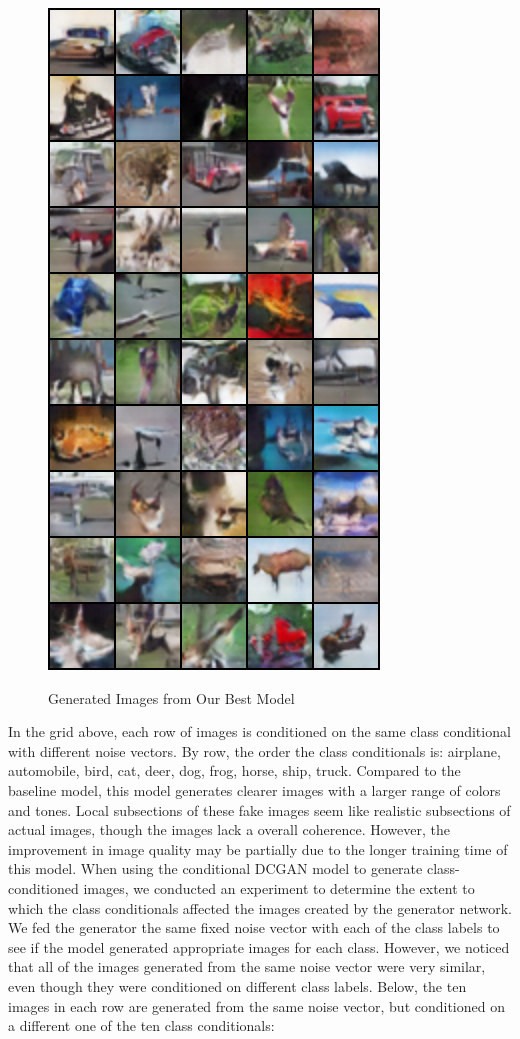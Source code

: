 \documentclass[a4paper]{article}
\begin{document}
\begin{figure}[H]
  \includegraphics[scale=0.5]{images/conditional_400_10x5_generated.png}
  \label{fig:boat1}
  \caption{Generated Images from Our Best Model}
\end{figure}
In the grid above, each row of images is conditioned on the same class conditional with different noise vectors. By row, the order the class conditionals is: airplane, automobile, bird, cat, deer, dog, frog, horse, ship, truck. Compared to the baseline model, this model generates clearer images with a larger range of colors and tones. Local subsections of these fake images seem like realistic subsections of actual images, though the images lack a overall coherence. However, the improvement in image quality may be partially due to the longer training time of this model.
\newline
\newline
When using the conditional DCGAN model to generate class-conditioned images, we conducted an experiment to determine the extent to which the class conditionals affected the images created by the generator network. We fed the generator the same fixed noise vector with each of the class labels to see if the model generated appropriate images for each class. However, we noticed that all of the images generated from the same noise vector were very similar, even though they were conditioned on different class labels. Below, the ten images in each row are generated from the same noise vector, but conditioned on a different one of the ten class conditionals:
\end{document}

